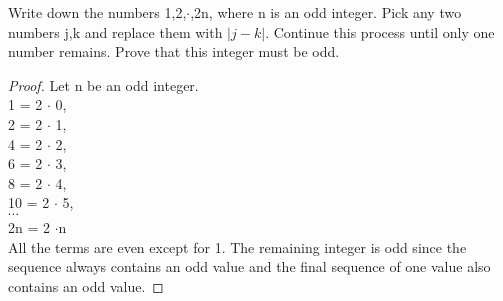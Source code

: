 \documentclass{discrete}
\begin{document}
\maketitle


\begin{prove}
  Write down the numbers 1,2,\(\cdot \),2n, where n is an odd integer. Pick any two numbers j,k and replace them with \(\lvert j-k \rvert \). Continue this process until only one number remains. Prove that this integer must be odd.
\end{prove}

\begin{proof}
  Let n be an odd integer.\\
  1 = 2 \(\cdot \) 0,\\
  2 = 2 \(\cdot \) 1,\\
  4 = 2 \(\cdot \) 2,\\
  6 = 2 \(\cdot \) 3,\\
  8 = 2 \(\cdot \) 4,\\
  10 = 2 \(\cdot \) 5,\\
  \(\cdots \) \\
  2n = 2 \(\cdot \)n\\
  All the terms are even except for 1. The remaining integer is odd since the sequence always contains an odd value and the final sequence of one value also contains an odd value.
\end{proof}
\end{document}
